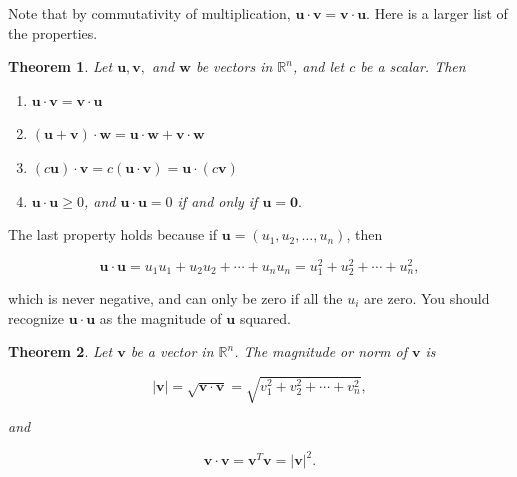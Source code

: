 \documentclass[
]{book}
\newtheorem{theorem}{Theorem}[chapter]
\theoremstyle{definition}
\theoremstyle{definition}
\theoremstyle{definition}
\theoremstyle{definition}
\theoremstyle{remark}
\begin{document}
Note that by commutativity of multiplication, \(\mathbf{u}\cdot \mathbf{v}=\mathbf{v}\cdot\mathbf{u}\). Here is a larger list of the properties.

\begin{theorembox}

\begin{theorem}

Let \(\mathbf{u}, \mathbf{v},\) and \(\mathbf{w}\) be vectors in \(\mathbb{R}^n\), and let \(c\) be a scalar. Then

\begin{enumerate}
\def\labelenumi{\arabic{enumi}.}
\item
  \(\mathbf{u}\cdot \mathbf{v}=\mathbf{v}\cdot \mathbf{u}\)
\item
  \((\mathbf{u}+\mathbf{v})\cdot \mathbf{w}=\mathbf{u}\cdot \mathbf{w}+\mathbf{v}\cdot \mathbf{w}\)
\item
  \((c\mathbf{u})\cdot \mathbf{v}=c(\mathbf{u}\cdot \mathbf{v})=\mathbf{u}\cdot(c\mathbf{v})\)
\item
  \(\mathbf{u}\cdot \mathbf{u}\geq 0\), and \(\mathbf{u}\cdot\mathbf{u}=0\) if and only if \(\mathbf{u}=\mathbf{0}.\)
\end{enumerate}

\end{theorem}

\end{theorembox}

The last property holds because if \(\mathbf{u}=(u_1,u_2,\dots,u_n)\), then

\[\mathbf{u}\cdot \mathbf{u}=u_1u_1+u_2u_2+\cdots+u_nu_n=u_1^2+u_2^2+\cdots+u_n^2,\]

which is never negative, and can only be zero if all the \(u_i\) are zero. You should recognize \(\mathbf{u}\cdot \mathbf{u}\) as the magnitude of \(\mathbf{u}\) squared.

\begin{theorembox}

\begin{theorem}
Let \(\mathbf{v}\) be a vector in \(\mathbb{R}^n\). The magnitude or \emph{norm} of \(\mathbf{v}\) is

\[|\mathbf{v}|=\sqrt{\mathbf{v}\cdot \mathbf{v}}=\sqrt{v_1^2+v_2^2+\cdots+v_n^2},\]

and

\[\mathbf{v}\cdot \mathbf{v}=\mathbf{v}^T\mathbf{v}=|\mathbf{v}|^2.\]
\end{theorem}

\end{theorembox}
\end{document}
